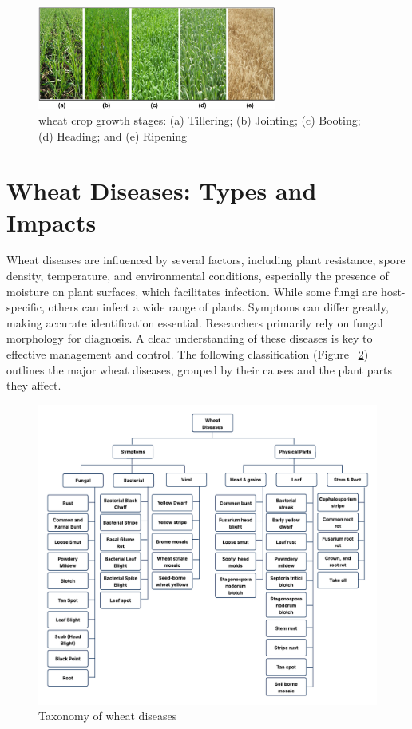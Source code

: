 \begin{figure}[H]
    \centering
    \includegraphics[width=0.7\textwidth]{chapters/chapter2/images/WheatStages.png}
    \caption{ wheat crop growth stages: (a) Tillering; (b) Jointing; (c) Booting; (d) Heading; and (e) Ripening \parencite{kumar2018estimation}}
    \label{fig:WheatStages}
\end{figure}



\section{Wheat Diseases: Types and Impacts}

Wheat diseases are influenced by several factors, including plant resistance, spore density, temperature, and environmental conditions, especially the presence of moisture on plant surfaces, which facilitates infection. While some fungi are host-specific, others can infect a wide range of plants. Symptoms can differ greatly, making accurate identification essential. Researchers primarily rely on fungal morphology for diagnosis. A clear understanding of these diseases is key to effective management and control. The following classification (Figure ~\ref{fig:Figure02}) outlines the major wheat diseases, grouped by their causes and the plant parts they affect.

\begin{figure}[H]
    \centering
    \includegraphics[width=0.9
    \textwidth]{chapters/chapter2/images/Figure02.png}
    \caption{Taxonomy of wheat diseases \protect\parencite{haider2021wheat}}
    \label{fig:Figure02}
\end{figure}

